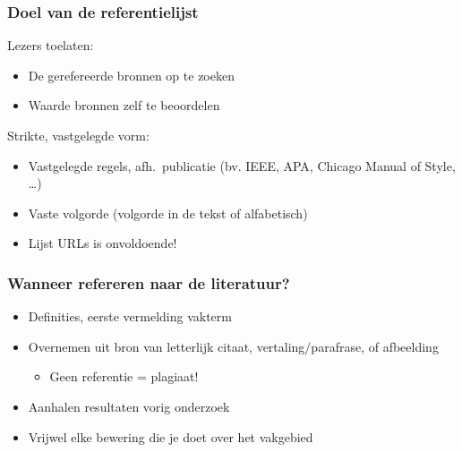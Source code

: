 \documentclass{beamer}
\begin{document}
\begin{frame}
  \frametitle{Doel van de referentielijst}

  Lezers toelaten:

  \begin{itemize}
    \item De gerefereerde bronnen op te zoeken
    \item Waarde bronnen zelf te beoordelen
  \end{itemize}

  \pause

  Strikte, vastgelegde vorm:

  \begin{itemize}
    \item Vastgelegde regels, afh.~publicatie (bv. IEEE, APA, Chicago Manual of Style, \ldots)
    \item Vaste volgorde (volgorde in de tekst of alfabetisch)
    \item Lijst URLs is onvoldoende!
  \end{itemize}

  \pause

\end{frame}

\begin{frame}
  \frametitle{Wanneer refereren naar de literatuur?}

  \begin{itemize}
    \item Definities, eerste vermelding vakterm
    \item Overnemen uit bron van letterlijk citaat, vertaling/parafrase, of afbeelding
      \begin{itemize}
        \item Geen referentie = \alert{plagiaat!}
      \end{itemize}
    \item Aanhalen resultaten vorig onderzoek
    \item Vrijwel elke bewering die je doet over het vakgebied
  \end{itemize}

  \vfill

\end{frame}
\end{document}

